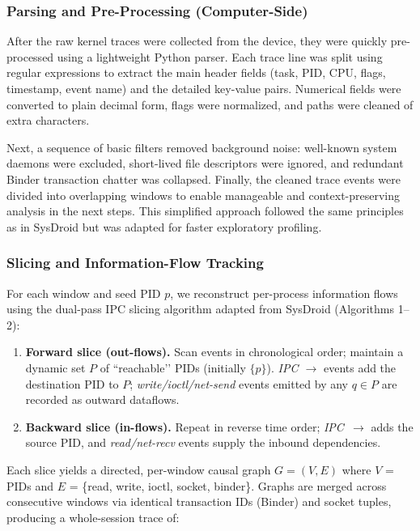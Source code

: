 \documentclass[a4paper,12pt]{report}
\begin{document}
\subsubsection{Parsing and Pre-Processing (Computer-Side)}
After the raw kernel traces were collected from the device, they were quickly pre-processed using a lightweight Python parser. Each trace line was split using regular expressions to extract the main header fields (task, PID, CPU, flags, timestamp, event name) and the detailed key-value pairs. Numerical fields were converted to plain decimal form, flags were normalized, and paths were cleaned of extra characters.

Next, a sequence of basic filters removed background noise: well-known system daemons were excluded, short-lived file descriptors were ignored, and redundant Binder transaction chatter was collapsed. Finally, the cleaned trace events were divided into overlapping windows to enable manageable and context-preserving analysis in the next steps. This simplified approach followed the same principles as in SysDroid but was adapted for faster exploratory profiling.

\subsubsection{Slicing and Information-Flow Tracking}

For each window and seed PID $p$, we reconstruct per-process
information flows using the dual-pass IPC slicing algorithm adapted
from SysDroid (Algorithms 1–2):

\begin{enumerate}
  \item \textbf{Forward slice (out-flows).}
        Scan events in chronological order; maintain a dynamic set
        $P$ of “reachable’’ PIDs (initially $\{p\}$).
        \emph{IPC $\rightarrow$} events add the destination PID to $P$;
        \emph{write/ioctl/net-send} events emitted by any
        $q\!\in\!P$ are recorded as outward dataflows.
  \item \textbf{Backward slice (in-flows).}
        Repeat in reverse time order; \emph{IPC~$\rightarrow$} adds
        the source PID, and \emph{read/net-recv} events supply the
        inbound dependencies.
\end{enumerate}

Each slice yields a directed, per-window causal graph
$G=(V,E)$ where
$V$ = PIDs and $E$ = \{read, write, ioctl, socket, binder\}.
Graphs are merged across consecutive windows via identical
transaction IDs (Binder) and socket tuples, producing a
whole-session trace of:
\end{document}
